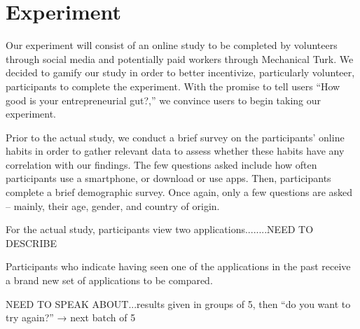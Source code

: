 \section{Experiment}

Our experiment will consist of an online study to be completed by volunteers through social media and potentially paid workers through Mechanical Turk. We decided to gamify our study in order to better incentivize, particularly volunteer, participants to complete the experiment. With the promise to tell users “How good is your entrepreneurial gut?,” we convince users to begin taking our experiment.

Prior to the actual study, we conduct a brief survey on the participants' online habits in order to gather relevant data to assess whether these habits have any correlation with our findings. The few questions asked include how often participants use a smartphone, or download or use apps. Then, participants complete a brief demographic survey. Once again, only a few questions are asked -- mainly, their age, gender, and country of origin.

For the actual study, participants view two applications........NEED TO DESCRIBE

Participants who indicate having seen one of the applications in the past receive a brand new set of applications to be compared.

NEED TO SPEAK ABOUT...results given in groups of 5, then “do you want to try again?” → next batch of 5



